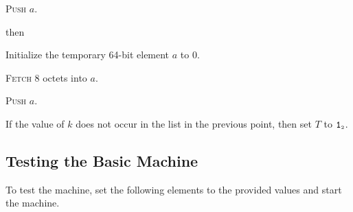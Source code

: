 \documentclass[a4paper,12pt]{article}
\newcommand{\num}[1]{\texttt{#1}}
\newcommand{\hex}[1]{\num{#1}_{\textup{\tiny 16}}}
\newcommand{\bin}[1]{\num{#1}_{\textup{\tiny 2}}}
\newcommand{\TERM}{T}
\newcommand{\T}{\bin{1}}
\newcommand{\proc}[1]{\textsc{#1}}
\newcommand{\op}[1]{$#1$}
\newcommand{\PUSHL}     [1]{\op{\hex{0B}}}
\begin{document}
\begin{stepnumbers}
\begin{description}
\begin{stepnumbers}
    \item \proc{Push} $a$.
    \end{stepnumbers}
  \item[\PUSHL{}] then
    \begin{stepnumbers}
    \item Initialize the temporary 64-bit element $a$ to 0.
    \item \proc{Fetch} 8 octets into $a$.
    \item \proc{Push} $a$.
    \end{stepnumbers}
  \end{description}
\item If the value of $k$ does not occur in the list in the previous point, then set $\TERM$ to $\T$.
\end{stepnumbers}

\subsection{Testing the Basic Machine}

To test the machine, set the following elements to the provided values and start the machine.
\end{document}

